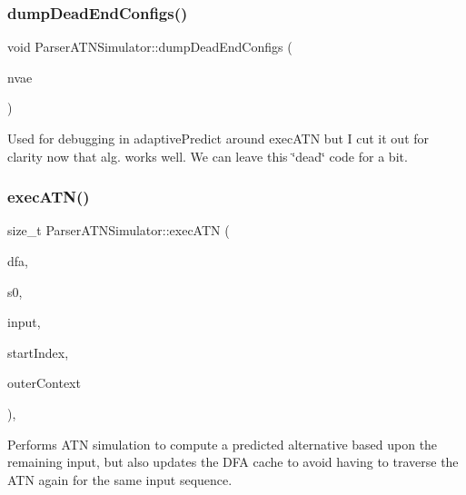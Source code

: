 \subsubsection{\texorpdfstring{dump\+Dead\+End\+Configs()}{dumpDeadEndConfigs()}}
{\footnotesize\ttfamily void Parser\+A\+T\+N\+Simulator\+::dump\+Dead\+End\+Configs (\begin{DoxyParamCaption}\item[{\hyperlink{classantlr4_1_1NoViableAltException}{No\+Viable\+Alt\+Exception} \&}]{nvae }\end{DoxyParamCaption})\hspace{0.3cm}{\ttfamily [virtual]}}



Used for debugging in adaptive\+Predict around exec\+A\+TN but I cut it out for clarity now that alg. works well. We can leave this \char`\"{}dead\char`\"{} code for a bit. 

\mbox{\label{classantlr4_1_1atn_1_1ParserATNSimulator_ac7fbaf0a637744b43e6709660a5b12f2}} 
\subsubsection{\texorpdfstring{exec\+A\+T\+N()}{execATN()}}
{\footnotesize\ttfamily size\+\_\+t Parser\+A\+T\+N\+Simulator\+::exec\+A\+TN (\begin{DoxyParamCaption}\item[{\hyperlink{classantlr4_1_1dfa_1_1DFA}{dfa\+::\+D\+FA} \&}]{dfa,  }\item[{dfa\+::\+D\+F\+A\+State $\ast$}]{s0,  }\item[{Token\+Stream $\ast$}]{input,  }\item[{size\+\_\+t}]{start\+Index,  }\item[{\hyperlink{classantlr4_1_1ParserRuleContext}{Parser\+Rule\+Context} $\ast$}]{outer\+Context }\end{DoxyParamCaption})\hspace{0.3cm}{\ttfamily [protected]}, {\ttfamily [virtual]}}



Performs A\+TN simulation to compute a predicted alternative based upon the remaining input, but also updates the D\+FA cache to avoid having to traverse the A\+TN again for the same input sequence. 

